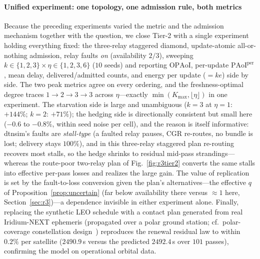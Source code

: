 \documentclass[twocolumn,3p,times,procedia]{elsarticle}
\newcommand{\OPAoI}{\mathrm{OPAoI}}
\newcommand{\PAoIper}{\mathrm{PAoI}^{\mathrm{per}}}
\begin{document}
\paragraph*{Unified experiment: one topology, one admission rule, both
metrics}
Because the preceding experiments varied the metric and the admission
mechanism together with the question, we close Tier-2 with a single
experiment holding everything fixed: the three-relay staggered diamond,
update-atomic all-or-nothing admission, relay faults \emph{on}
(availability $2/3$), sweeping $k\in\{1,2,3\}\times
\eta\in\{1,2,3,6\}$ ($10$ seeds) and reporting $\OPAoI$, per-update
$\PAoIper$, mean delay, delivered/admitted counts, and energy per
update ($=ke$) side by side. The two peak metrics agree on every
ordering, and the freshness-optimal degree traces
$1\to2\to3\to3$ across $\eta$---exactly
$\min(K_{\max},\lfloor\eta\rfloor)$ in one experiment. The starvation
side is large and unambiguous ($k{=}3$ at $\eta{=}1$: $+144\%$;
$k{=}2$: $+71\%$); the hedging side is directionally consistent but
small here ($-0.6$ to $-0.8\%$, within seed noise per cell), and the
reason is itself informative: dtnsim's faults are \emph{stall-type}
(a faulted relay pauses, CGR re-routes, no bundle is lost; delivery
stays $100\%$), and in this three-relay staggered plan re-routing
recovers most stalls, so the hedge shrinks to residual mid-pass
strandings---whereas the route-poor two-relay plan of
Fig.~\ref{fig:r3tier2} converts the same stalls into effective
per-pass losses and realizes the large gain. The value of replication
is set by the fault-to-loss conversion given the plan's
alternatives---the effective $q$ of
Proposition~\ref{prop:uncertain} (far below availability there versus
${\approx}1$ here, Section~\ref{sec:r3})---a dependence invisible in
either experiment alone. Finally, replacing the synthetic
LEO schedule with a contact plan generated from real Iridium-NEXT
ephemeris (propagated over a polar ground station; cf.\ polar-coverage
constellation design~\cite{ma2026igso}) reproduces the renewal
residual law to within $0.2\%$ per satellite ($2490.9$\,s versus the
predicted $2492.4$\,s over $101$ passes), confirming the model on
operational orbital data.
\end{document}
